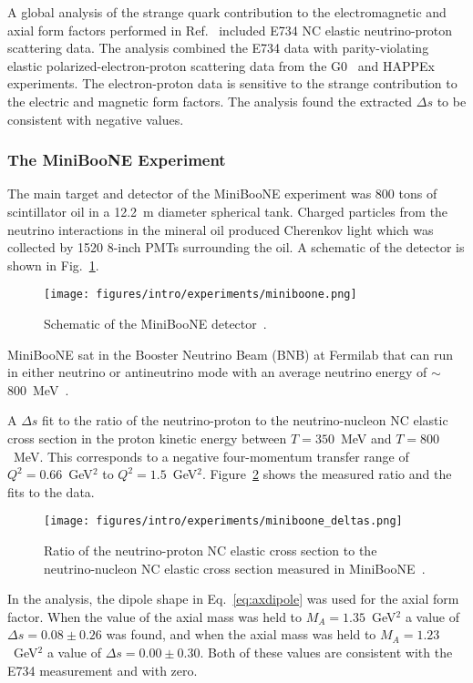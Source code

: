   A global analysis of the strange quark contribution to the electromagnetic
  and axial form factors performed in Ref.~\cite{Pate:2008va} included E734 NC
  elastic neutrino-proton scattering data. The analysis combined the E734 data
  with parity-violating elastic polarized-electron-proton scattering data from
  the G0~\cite{Armstrong:2005hs} and HAPPEx~\cite{Aniol:2004hp} experiments.
  The electron-proton data is sensitive to the strange contribution to the
  electric and magnetic form factors. The analysis found the extracted $\Delta
  s$ to be consistent with negative values.

  \subsubsection{The MiniBooNE Experiment}\label{sec:miniboonence}
  The main target and detector of the MiniBooNE experiment was 800 tons of
  scintillator oil in a 12.2~m diameter spherical tank. Charged particles
  from the neutrino interactions in the mineral oil produced Cherenkov light
  which was collected by 1520 8-inch PMTs surrounding the oil. A schematic of
  the detector is shown in Fig.~\ref{fig:miniboonedetector}.
  \begin{figure}[h]
    \centering
    \texttt{[image: figures/intro/experiments/miniboone.png]}
    \caption{Schematic of the MiniBooNE detector~\cite{Cheng:2012yy}.}
    \label{fig:miniboonedetector}
  \end{figure}
  MiniBooNE sat in the Booster Neutrino Beam (BNB) at Fermilab that can run
  in either neutrino or antineutrino mode with an average neutrino energy of
  $\sim$800~MeV~\cite{Aguilar-Arevalo:2008yp}.

  A $\Delta s$ fit to the ratio of the neutrino-proton to the
  neutrino-nucleon NC elastic cross section in the proton kinetic energy
  between $T = 350$~MeV and $T = 800$~MeV. This corresponds to a negative
  four-momentum transfer range of $Q^2 = 0.66$~GeV$^2$ to $Q^2 =
  1.5$~GeV$^2$. Figure~\ref{fig:miniboonedeltas} shows the measured ratio and
  the fits to the data.
  \begin{figure}[h]
    \centering
    \texttt{[image: figures/intro/experiments/miniboone\_deltas.png]}
    \caption{Ratio of the neutrino-proton NC elastic cross section to the
    neutrino-nucleon NC elastic cross section measured in
    MiniBooNE~\cite{Aguilar-Arevalo:2010cx}.}
    \label{fig:miniboonedeltas}
  \end{figure}
  In the analysis, the dipole shape in Eq.~\ref{eq:axdipole} was used for the
  axial form factor. When the value of the axial mass was held to $M_A =
  1.35$~GeV$^2$ a value of $\Delta s = 0.08 \pm 0.26$ was found, and when the
  axial mass was held to $M_A = 1.23$~GeV$^2$ a value of $\Delta s = 0.00 \pm
  0.30$. Both of these values are consistent with the E734 measurement and
  with zero.

